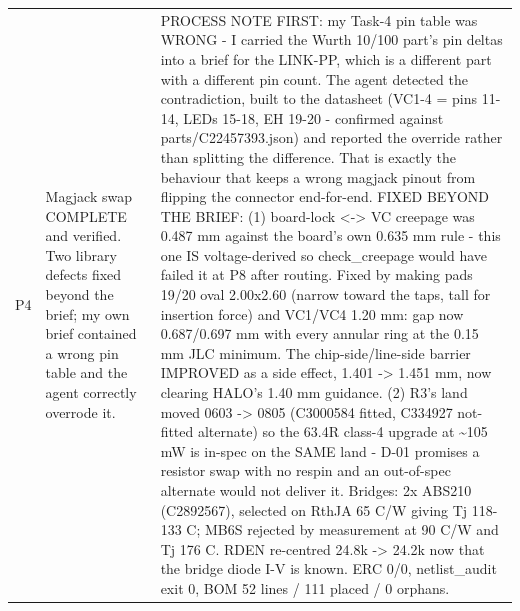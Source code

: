 \documentclass[11pt,a4paper]{article}
\begin{document}
{\begin{longtable}{lp{5.2cm}p{7.2cm}}
P4 & Magjack swap COMPLETE and verified. Two library defects fixed beyond the brief; my own brief contained a wrong pin table and the agent correctly overrode it. & PROCESS NOTE FIRST: my Task-4 pin table was WRONG - I carried the Wurth 10/100 part's pin deltas into a brief for the LINK-PP, which is a different part with a different pin count. The agent detected the contradiction, built to the datasheet (VC1-4 = pins 11-14, LEDs 15-18, EH 19-20 - confirmed against parts/C22457393.json) and reported the override rather than splitting the difference. That is exactly the behaviour that keeps a wrong magjack pinout from flipping the connector end-for-end. FIXED BEYOND THE BRIEF: (1) board-lock \textless{}-\textgreater{} VC creepage was 0.487 mm against the board's own 0.635 mm rule - this one IS voltage-derived so check\_creepage would have failed it at P8 after routing. Fixed by making pads 19/20 oval 2.00x2.60 (narrow toward the taps, tall for insertion force) and VC1/VC4 1.20 mm: gap now 0.687/0.697 mm with every annular ring at the 0.15 mm JLC minimum. The chip-side/line-side barrier IMPROVED as a side effect, 1.401 -\textgreater{} 1.451 mm, now clearing HALO's 1.40 mm guidance. (2) R3's land moved 0603 -\textgreater{} 0805 (C3000584 fitted, C334927 not-fitted alternate) so the 63.4R class-4 upgrade at \textasciitilde{}105 mW is in-spec on the SAME land - D-01 promises a resistor swap with no respin and an out-of-spec alternate would not deliver it. Bridges: 2x ABS210 (C2892567), selected on RthJA 65 C/W giving Tj 118-133 C; MB6S rejected by measurement at 90 C/W and Tj 176 C. RDEN re-centred 24.8k -\textgreater{} 24.2k now that the bridge diode I-V is known. ERC 0/0, netlist\_audit exit 0, BOM 52 lines / 111 placed / 0 orphans. \\

\end{longtable}}
\end{document}

